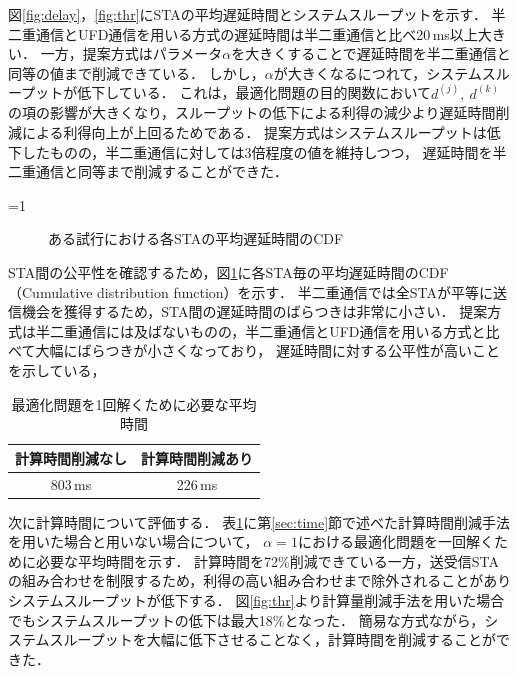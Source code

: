 \documentclass[master]{kuisthesis}		%
\newcounter{flagFig}
\begin{document}
			\par
			図\ref{fig:delay}，\ref{fig:thr}にSTAの平均遅延時間とシステムスループットを示す．
			半二重通信とUFD通信を用いる方式の遅延時間は半二重通信と比べ20\,ms以上大きい．
			一方，提案方式はパラメータ$\alpha$を大きくすることで遅延時間を半二重通信と同等の値まで削減できている．
			しかし，$\alpha$が大きくなるにつれて，システムスループットが低下している．
			これは，最適化問題の目的関数において$d^{(j)},\ d^{(k)}$の項の影響が大きくなり，スループットの低下による利得の減少より遅延時間削減による利得向上が上回るためである．
			提案方式はシステムスループットは低下したものの，半二重通信に対しては3倍程度の値を維持しつつ，
			遅延時間を半二重通信と同等まで削減することができた．
			\par
			\ifnum\value{flagFig}=1 {\begin{figure}[htbp]
				\centering
				\caption{ある試行における各STAの平均遅延時間のCDF}
				\label{fig:cdf}
			\end{figure}}\fi
			STA間の公平性を確認するため，図\ref{fig:cdf}に各STA毎の平均遅延時間のCDF（Cumulative distribution function）を示す．
			半二重通信では全STAが平等に送信機会を獲得するため，STA間の遅延時間のばらつきは非常に小さい．
			提案方式は半二重通信には及ばないものの，半二重通信とUFD通信を用いる方式と比べて大幅にばらつきが小さくなっており，
			遅延時間に対する公平性が高いことを示している，



			\par
			\begin{table}[htbp]
				\centering
				\caption{最適化問題を1回解くために必要な平均時間}
				\label{tab:time}
				\begin{tabular}{cc}
			 	計算時間削減なし & 計算時間削減あり\\ \hline
				803\,ms & 226\,ms \\\hline
				\end{tabular}
			\end{table}
			次に計算時間について評価する．
			表\ref{tab:time}に第\ref{sec:time}節で述べた計算時間削減手法を用いた場合と用いない場合について，
			$\alpha=1$における最適化問題を一回解くために必要な平均時間を示す．
			計算時間を72\%削減できている一方，送受信STAの組み合わせを制限するため，利得の高い組み合わせまで除外されることがありシステムスループットが低下する．
			図\ref{fig:thr}より計算量削減手法を用いた場合でもシステムスループットの低下は最大18\%となった．
			簡易な方式ながら，システムスループットを大幅に低下させることなく，計算時間を削減することができた．
\end{document}
